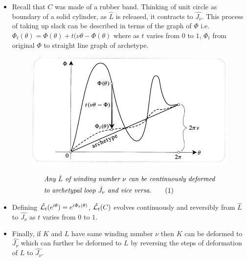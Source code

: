 \documentclass[12pt]{article}
\newcommand\numberthis{\addtocounter{equation}{1}\tag{\theequation}}
\def\tt{\textit}
\def\mc{\ensuremath\mathcal}
\begin{document}
\begin{itemize}
\begin{itemize}
        \item Recall that $C$ was made of a rubber band. Thinking of unit circle as boundary of a solid cylinder, as $\hat{L}$ is released, it contracts to $\hat{J_{\nu}}$. This process of taking up slack can be described in terms of the graph of $\Phi$ i.e. $\Phi_{t}(\theta) = \Phi(\theta)+t(\nu\theta - \Phi(\theta)$ where as $t$ varies from $0$ to $1$, $\Phi_{t}$ from original $\Phi$ to straight line graph of archetype.
        \begin{figure}[h!]
            \centering
            \includegraphics[scale=0.7]{fig_4}
            \label{f4}
        \end{figure} 
        \begin{align*}
            &\tt{Any $\hat{L}$ of winding number $\nu$ can be continuously deformed}\\
            &\tt{to archetypal loop $\hat{J_{\nu}}$ and vice versa.} \numberthis \label{e3}
        \end{align*}
        \item Defining $\hat{\mc{L}_{t}}(e^{i\theta}) = e^{i\Phi_{t}(\theta)}$, $\hat{\mc{L}_{t}}(C)$ evolves continuously and reversibly from $\hat{L}$ to $\hat{J_{\nu}}$ as $t$ varies from $0$ to $1$.
        \item Finally, if $K$ and $L$ have same winding number $\nu$ then $K$ can be deformed to $\hat{J_{\nu}}$ which can further be deformed to $L$ by reversing the steps of deformation of $L$ to $\hat{J_{\nu}}$.
    \end{itemize}
\end{itemize}
\end{document}
